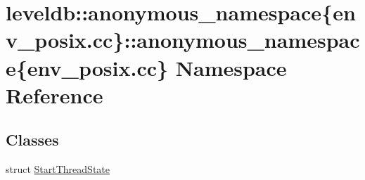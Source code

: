 \hypertarget{namespaceleveldb_1_1anonymous__namespace_02env__posix_8cc_03_1_1anonymous__namespace_02env__posix_8cc_03}{}\section{leveldb\+:\+:anonymous\+\_\+namespace\{env\+\_\+posix.\+cc\}\+:\+:anonymous\+\_\+namespace\{env\+\_\+posix.\+cc\} Namespace Reference}
\label{namespaceleveldb_1_1anonymous__namespace_02env__posix_8cc_03_1_1anonymous__namespace_02env__posix_8cc_03}
\subsection*{Classes}
\begin{DoxyCompactItemize}
\item 
struct \hyperlink{structleveldb_1_1anonymous__namespace_02env__posix_8cc_03_1_1anonymous__namespace_02env__posix_8cc_03_1_1_start_thread_state}{Start\+Thread\+State}
\end{DoxyCompactItemize}
